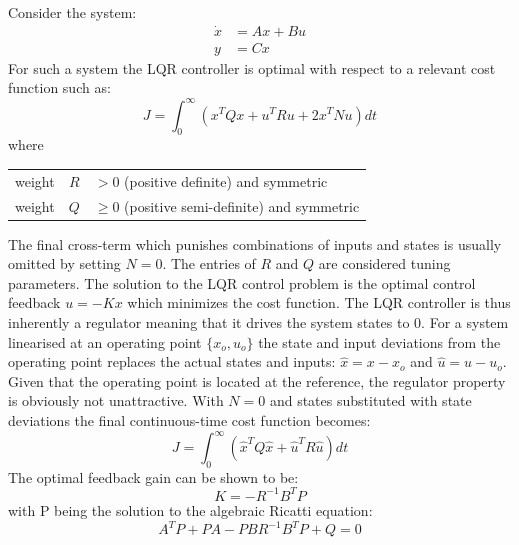 \smallskip
\noindent Consider the system:
\begin{equation}\label{eq:ctrl_sys}
	\begin{split}
		\dot x &= A x + B u \\
		y &= Cx
	\end{split}
\end{equation}
For such a system the LQR controller is optimal with respect to a relevant cost function such as:
\begin{equation}\label{eq:lqr_cost}
	J = \int_{0}^{\infty} \left(x^T Q x + u^T R u + 2x^T N u\right) dt
\end{equation}
where
\begin{center}
	\begin{tabular}{l r l }
		weight & $R$         & $ > 0$\hspace{1mm} (positive definite) and symmetric       \\
		weight & $Q$		 & $\ge 0$\hspace{1mm} (positive semi-definite) and symmetric
	\end{tabular}
\end{center}
\smallskip
The final cross-term which punishes combinations of inputs and states is usually omitted by setting $ N = 0 $. The entries of $ R $ and $ Q $ are considered tuning parameters. The solution to the LQR control problem is the optimal control feedback $ u = -Kx $ which minimizes the cost function. The LQR controller is thus inherently a regulator meaning that it drives the system states to 0. For a system linearised at an operating point $ \{x_o, u_o\} $ the state and input deviations from the operating point replaces the actual states and inputs: $ \hat x = x-x_o $ and $ \hat u = u-u_o $. Given that the operating point is located at the reference, the regulator property is obviously not unattractive. With $ N = 0 $ and states substituted with state deviations the final continuous-time cost function becomes:
\begin{equation}\label{eq:lqr_cost_final}
	J = \int_{0}^{\infty} \left(\hat x^T Q \hat x + \hat u^T R \hat u\right) dt
\end{equation}
The optimal feedback gain can be shown to be: 
\begin{equation}\label{eq:lqr_K}
	K = -R^{-1} B^T P
\end{equation}
with P being the solution to the algebraic Ricatti equation:
\begin{equation}\label{lqr:ricatti}
	A^T P + P A - P B R^{-1} B^T P + Q = 0
\end{equation}
